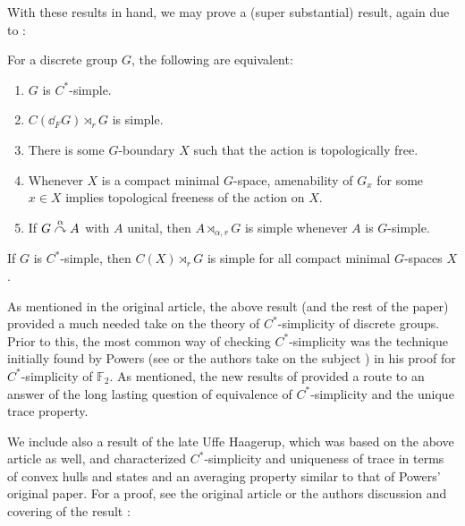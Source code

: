 With these results in hand, we may prove a (super substantial) result, again due to \cite{breuillard2017c}:
\begin{theorem}
	For a discrete group $G$, the following are equivalent:
	\begin{enumerate}
		\item $G$ is $C^*$-simple.
		\item $C(\dd_F G) \rtimes_r G$ is simple.
		\item There is some $G$-boundary $X$ such that the action is topologically free.
		\item Whenever $X$ is a compact minimal $G$-space, amenability of $G_x$ for some $x \in X$ implies topological freeness of the action on $X$.
		\item If $G \stackrel{\alpha}{\curvearrowright} A$ with $A$ unital, then $A \rtimes_{\alpha,r} G$ is simple whenever $A$ is $G$-simple.
	\end{enumerate}
	\label{breulcsimple}
\end{theorem}
\begin{corollary}
	If $G$ is $C^*$-simple, then $C(X) \rtimes_{r}G$ is simple for all compact minimal $G$-spaces $X$.
\end{corollary}
\begin{note}
	As mentioned in the original article, the above result (and the rest of the paper) provided a much needed take on the theory of $C^*$-simplicity of discrete groups. Prior to this, the most common way of checking $C^*$-simplicity was the technique initially found by Powers (see \cite{powers1975simplicity} or the authors take on the subject \cite[chapter 3]{bscp}) in his proof for $C^*$-simplicity of $\mathbb{F}_2$. As mentioned, the new results of \cite{breuillard2017c} provided a route to an answer of the long lasting question of equivalence of $C^*$-simplicity and the unique trace property.
\end{note}
We include also a result of the late Uffe Haagerup, which was based on the above article as well, and characterized $C^*$-simplicity and uniqueness of trace in terms of convex hulls and states and an averaging property similar to that of Powers' original paper. For a proof, see the original article \cite{haagerup2015new} or the authors discussion and covering of the result \cite[Chapter 5]{bscp}:
